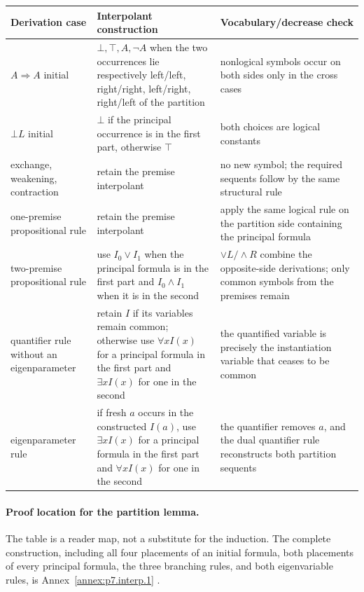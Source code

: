 \begin{center}
\begin{tabularx}{\textwidth}{@{}p{} X X@{}}
\toprule
Derivation case & Interpolant construction & Vocabulary/decrease check \\
\midrule
\(A\Rightarrow A\) initial & \(\bot,\top,A,\neg A\) when the two occurrences lie respectively left/left, right/right, left/right, right/left of the partition & nonlogical symbols occur on both sides only in the cross cases \\
\(\bot L\) initial & \(\bot\) if the principal occurrence is in the first part, otherwise \(\top\) & both choices are logical constants \\
exchange, weakening, contraction & retain the premise interpolant & no new symbol; the required sequents follow by the same structural rule \\
one-premise propositional rule & retain the premise interpolant & apply the same logical rule on the partition side containing the principal formula \\
two-premise propositional rule & use \(I_0\lor I_1\) when the principal formula is in the first part and \(I_0\land I_1\) when it is in the second & \(\lor L/\land R\) combine the opposite-side derivations; only common symbols from the premises remain \\
quantifier rule without an eigenparameter & retain \(I\) if its variables remain common; otherwise use \(\forall xI(x)\) for a principal formula in the first part and \(\exists xI(x)\) for one in the second & the quantified variable is precisely the instantiation variable that ceases to be common \\
eigenparameter rule & if fresh \(a\) occurs in the constructed \(I(a)\), use \(\exists xI(x)\) for a principal formula in the first part and \(\forall xI(x)\) for one in the second & the quantifier removes \(a\), and the dual quantifier rule reconstructs both partition sequents \\
\bottomrule
\end{tabularx}
\end{center}

\paragraph{Proof location for the partition lemma.}
The table is a reader map, not a substitute for the induction.  The complete
construction, including all four placements of an initial formula, both
placements of every principal formula, the three branching rules, and both
eigenvariable rules, is Annex~\ref{annex:p7.interp.1}
\cite{Maehara1960}.

